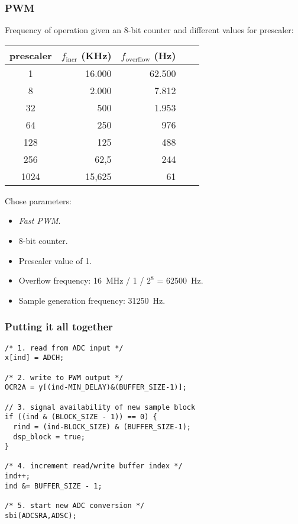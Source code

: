 \subsubsection{PWM}

Frequency of operation given an 8-bit counter and different values for
prescaler:

\begin{center}
\begin{tabular}{crrrr}
\toprule
\toprule
\footnotesize{prescaler} &
\footnotesize{$f_\text{incr}$ (KHz)} &
\footnotesize{$f_\text{overflow}$ (Hz)}  \\
\midrule
1 & 16.000 & 62.500 \\
8 & 2.000 & 7.812 \\
32 & 500 & 1.953 \\
64 & 250 & 976 \\
128 & 125 & 488 \\
256 & 62,5 & 244 \\
1024 & 15,625 & 61 \\
\bottomrule
\end{tabular}
\end{center}

Chose parameters:

\begin{itemize}
  \item \emph{Fast PWM}.
  \item 8-bit counter.
  \item Prescaler value of 1.
  \item Overflow frequency: 16~MHz / 1 / $2^8$ = 62500~Hz.
  \item Sample generation frequency: 31250~Hz.
\end{itemize}

\subsubsection{Putting it all together}

\begin{lstlisting}
/* 1. read from ADC input */
x[ind] = ADCH;

/* 2. write to PWM output */
OCR2A = y[(ind-MIN_DELAY)&(BUFFER_SIZE-1)];

// 3. signal availability of new sample block
if ((ind & (BLOCK_SIZE - 1)) == 0) {
  rind = (ind-BLOCK_SIZE) & (BUFFER_SIZE-1);
  dsp_block = true;
}

/* 4. increment read/write buffer index */
ind++;
ind &= BUFFER_SIZE - 1;

/* 5. start new ADC conversion */
sbi(ADCSRA,ADSC); 
\end{lstlisting}



